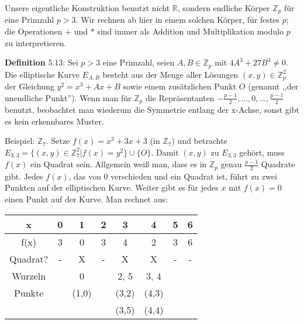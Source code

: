 \documentclass[a4paper]{article}
\begin{document}
\begin{multicols}{3}
    Unsere eigentliche Konstruktion benutzt nicht $\mathbb{R}$, sondern endliche Körper $\mathbb{Z}_p$ für eine Primzahl $p>3$. Wir rechnen ab hier in einem solchen Körper, für festes $p$; die Operationen $+$ und $*$ sind immer als Addition und Multiplikation modulo $p$ zu interpretieren.

    \textbf{Definition} 5.13: Sei $p >3$ eine Primzahl, seien $A,B\in\mathbb{Z}_p$ mit $4A^3+ 27B^3 \not= 0$. Die elliptische Kurve $E_{A,B}$ besteht aus der Menge aller Lösungen $(x,y)\in\mathbb{Z}^2_p$ der Gleichung $y^2=x^3+Ax+B$ sowie einem zusätzlichen Punkt $O$ (genannt ,,der unendliche Punkt'').
    Wenn man für $\mathbb{Z}_p$ die Repräsentanten $-\frac{p-1}{2},..., 0 , ...,\frac{p-1}{2}$ benutzt, beobachtet man wiederum die Symmetrie entlang der x-Achse, sonst gibt es kein erkennbares Muster.

    Beispiel: $\mathbb{Z}_7$. Setze $f(x)=x^3+ 3x+ 3$ (in $\mathbb{Z}_7$) und betrachte $E_{3,3}=\{(x,y)\in\mathbb{Z}^2_7 | f(x)=y^2\}\cup \{O\}$. Damit $(x,y)$ zu $E_{3,3}$ gehört, muss $f(x)$ ein Quadrat sein. Allgemein weiß man, dass es in $\mathbb{Z}_p$ genau $\frac{p-1}{2}$ Quadrate gibt. Jedes $f(x)$, das von $0$ verschieden und ein Quadrat ist, führt zu zwei Punkten auf der elliptischen Kurve. Weiter gibt es für jedes $x$ mit $f(x) = 0$ einen Punkt auf der Kurve. Man rechnet aus:

    \begin{tabular}{c|c|c|c|c|c|c|c}
        x        & 0 & 1     & 2 & 3     & 4     & 5 & 6 \\\hline
        f(x)     & 3 & 0     & 3 & 4     & 2     & 3 & 6 \\
        Quadrat? & - & X     & - & X     & X     & - & - \\
        Wurzeln  &   & 0     &   & 2, 5  & 3, 4  &       \\
        Punkte   &   & (1,0) &   & (3,2) & (4,3)         \\
                 &   &       &   & (3,5) & (4,4)
    \end{tabular}


\end{multicols}
\end{document}
